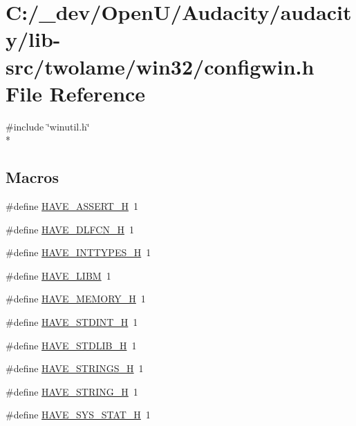 \hypertarget{lib-src_2twolame_2win32_2configwin_8h}{}\section{C\+:/\+\_\+dev/\+Open\+U/\+Audacity/audacity/lib-\/src/twolame/win32/configwin.h File Reference}
\label{lib-src_2twolame_2win32_2configwin_8h}
{\ttfamily \#include \char`\"{}winutil.\+h\char`\"{}}\\*
\subsection*{Macros}
\begin{DoxyCompactItemize}
\item 
\#define \hyperlink{lib-src_2twolame_2win32_2configwin_8h_ad0eabe2e5407bc73450eb15b657983cd}{H\+A\+V\+E\+\_\+\+A\+S\+S\+E\+R\+T\+\_\+H}~1
\item 
\#define \hyperlink{lib-src_2twolame_2win32_2configwin_8h_a0ee1617ff2f6885ef384a3dd46f9b9d7}{H\+A\+V\+E\+\_\+\+D\+L\+F\+C\+N\+\_\+H}~1
\item 
\#define \hyperlink{lib-src_2twolame_2win32_2configwin_8h_ab90a030ff2790ebdc176660a6dd2a478}{H\+A\+V\+E\+\_\+\+I\+N\+T\+T\+Y\+P\+E\+S\+\_\+H}~1
\item 
\#define \hyperlink{lib-src_2twolame_2win32_2configwin_8h_a822fccccd955b712f62f5ade934e86fc}{H\+A\+V\+E\+\_\+\+L\+I\+BM}~1
\item 
\#define \hyperlink{lib-src_2twolame_2win32_2configwin_8h_ae93a78f9d076138897af441c9f86f285}{H\+A\+V\+E\+\_\+\+M\+E\+M\+O\+R\+Y\+\_\+H}~1
\item 
\#define \hyperlink{lib-src_2twolame_2win32_2configwin_8h_ab6cd6d1c63c1e26ea2d4537b77148354}{H\+A\+V\+E\+\_\+\+S\+T\+D\+I\+N\+T\+\_\+H}~1
\item 
\#define \hyperlink{lib-src_2twolame_2win32_2configwin_8h_a9e0e434ec1a6ddbd97db12b5a32905e0}{H\+A\+V\+E\+\_\+\+S\+T\+D\+L\+I\+B\+\_\+H}~1
\item 
\#define \hyperlink{lib-src_2twolame_2win32_2configwin_8h_a405d10d46190bcb0320524c54eafc850}{H\+A\+V\+E\+\_\+\+S\+T\+R\+I\+N\+G\+S\+\_\+H}~1
\item 
\#define \hyperlink{lib-src_2twolame_2win32_2configwin_8h_ad4c234dd1625255dc626a15886306e7d}{H\+A\+V\+E\+\_\+\+S\+T\+R\+I\+N\+G\+\_\+H}~1
\item 
\#define \hyperlink{lib-src_2twolame_2win32_2configwin_8h_ace156430ba007d19b4348a950d0c692b}{H\+A\+V\+E\+\_\+\+S\+Y\+S\+\_\+\+S\+T\+A\+T\+\_\+H}~1

\end{DoxyCompactItemize}
